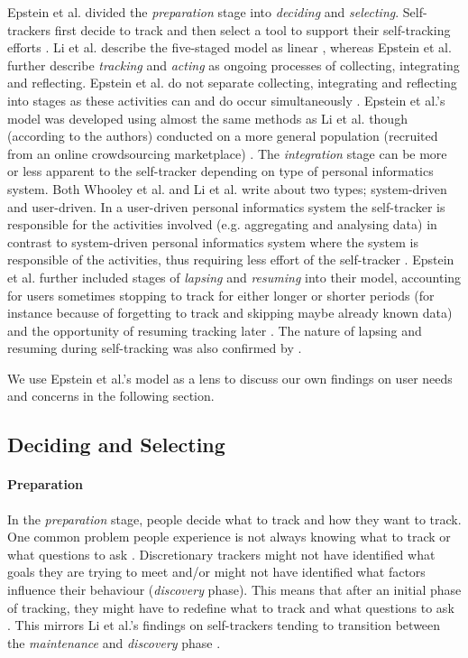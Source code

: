 Epstein et al. divided the \textit{preparation} stage into \textit{deciding} and \textit{selecting}. Self-trackers first decide to track and then select a tool to support their self-tracking efforts \citep{Epstein2015}. Li et al. describe the five-staged model as linear \citep{Li2010}, whereas Epstein et al. further describe \textit{tracking} and \textit{acting} as ongoing processes of collecting, integrating and reflecting. Epstein et al. do not separate collecting, integrating and reflecting into stages as these activities can and do occur simultaneously \citep{Epstein2015, MacLeod2014}. Epstein et al.'s model was developed using almost the same methods as Li et al. though (according to the authors) conducted on a more general population (recruited from an online crowdsourcing marketplace) \citep{Epstein2015}. The \textit{integration} stage can be more or less apparent to the self-tracker depending on type of personal informatics system. Both Whooley et al. and Li et al. write about two types; system-driven and user-driven. In a user-driven personal informatics system the self-tracker is responsible for the activities involved (e.g. aggregating and analysing data) in contrast to system-driven personal informatics system where the system is responsible of the activities, thus requiring less effort of the self-tracker \citep{Whooley2014,Li2010}. Epstein et al. further included stages of \textit{lapsing} and \textit{resuming} into their model, accounting for users sometimes stopping to track for either longer or shorter periods (for instance because of forgetting to track and skipping maybe already known data) and the opportunity of resuming tracking later \citep{Epstein2015}. The nature of lapsing and resuming during self-tracking was also confirmed by \citep{Rooksby2014}. 

We use Epstein et al.'s model as a lens to discuss our own findings on user needs and concerns in the following section. 

\subsection{Deciding and Selecting}
\paragraph{Preparation}
In the \textit{preparation} stage, people decide what to track and how they want to track. One common problem people experience is not always knowing what to track or what questions to ask \citep{Li2011, Choe2014, Chung2015, Patel2012}. Discretionary trackers might not have identified what goals they are trying to meet and/or might not have identified what factors influence their behaviour (\textit{discovery} phase). This means that after an initial phase of tracking, they might have to redefine what to track and what questions to ask \citep{Choe2014}. This mirrors  Li et al.'s findings on self-trackers tending to transition between the \textit{maintenance} and \textit{discovery} phase \citep{Li2011}. 

